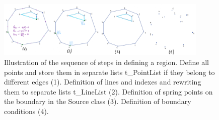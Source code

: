 \documentclass[]{pracamgr}
\begin{document}
      \begin{figure}[H]
        \centering
        \includegraphics[width=0.9\textwidth]{figs/region_workflow.png}
        \caption{Illustration of the sequence of steps in defining a region. Define all points and store them in separate lists t\_PointList if they belong to different edges (1). Definition of lines and indexes and rewriting them to separate lists t\_LineList (2). Definition of spring points on the boundary in the Source class (3). Definition of boundary conditions (4).}
        \label{region_workflow}
      \end{figure}
\end{document}
